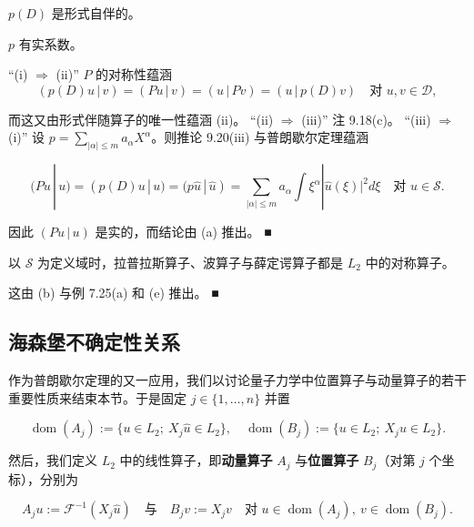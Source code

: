 \begin{remark}
\begin{items}
\begin{subitems}
\item

$ p(D) $ 是形式自伴的。

\item

$ p $ 有实系数。

\proofhead
“(i) $ \Rightarrow $ (ii)” $ P $ 的对称性蕴涵
\[
(p(D)u\,|\,v) = (Pu\,|\,v) = (u\,|\,Pv) = (u\,|\,p(D)v) \quad \text{对 } u, v \in \mathcal{D} ,
\]

而这又由形式伴随算子的唯一性蕴涵 (ii)。
“(ii) $ \Rightarrow $ (iii)” 注 9.18(c)。
“(iii) $ \Rightarrow $ (i)” 设 $ p = \sum_{|\alpha| \le m} a_\alpha X^\alpha $。则推论 9.20(iii) 与普朗歇尔定理蕴涵

\[
(Pu\,|\,u) = (p(D)u\,|\,u) = (p\hat{u}\,|\,\hat{u}) = \sum_{|\alpha| \le m} a_\alpha \int \xi^\alpha |\hat{u}(\xi)|^2 d\xi \quad \text{对 } u \in \mathcal{S} .
\]

因此 $ (Pu\,|\,u) $ 是实的，而结论由 (a) 推出。 \nobreak\hspace{0.35em}■

\end{subitems}

\item

以 $ \mathcal{S} $ 为定义域时，拉普拉斯算子、波算子与薛定谔算子都是 $ L_2 $ 中的对称算子。

\proofhead
这由 (b) 与例 7.25(a) 和 (e) 推出。 \nobreak\hspace{0.35em}■
\end{items}

\end{remark}

\subsection*{海森堡不确定性关系}

作为普朗歇尔定理的又一应用，我们以讨论量子力学中位置算子与动量算子的若干重要性质来结束本节。于是固定 $ j \in \{1,\ldots,n\} $ 并置

\[
\operatorname{dom}(A_j) := \{ u \in L_2 ;\ X_j\hat{u} \in L_2 \} , \quad \operatorname{dom}(B_j) := \{ u \in L_2 ;\ X_j u \in L_2 \} .
\]

然后，我们定义 $ L_2 $ 中的线性算子，即\textbf{动量算子} $ A_j $ 与\textbf{位置算子} $ B_j $（对第 $ j $ 个坐标），分别为

\[
A_j u := \mathcal{F}^{-1}(X_j\hat{u}) \quad \text{与} \quad B_j v := X_j v \quad \text{对 } u \in \operatorname{dom}(A_j) , \ v \in \operatorname{dom}(B_j) .
\]

